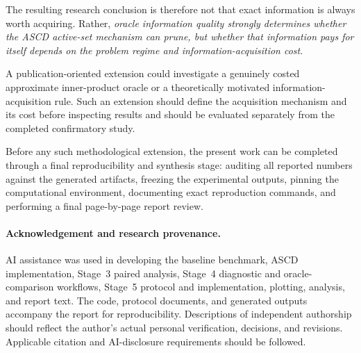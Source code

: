 \documentclass[11pt]{article}
\begin{document}
The resulting research conclusion is therefore not that exact
information is always worth acquiring. Rather, \emph{oracle information
quality strongly determines whether the ASCD active-set mechanism can
prune, but whether that information pays for itself depends on the
problem regime and information-acquisition cost}.

A publication-oriented extension could investigate a genuinely costed
approximate inner-product oracle or a theoretically motivated
information-acquisition rule. Such an extension should define the
acquisition mechanism and its cost before inspecting results and should
be evaluated separately from the completed confirmatory study.

Before any such methodological extension, the present work can be
completed through a final reproducibility and synthesis stage:
auditing all reported numbers against the generated artifacts, freezing
the experimental outputs, pinning the computational environment,
documenting exact reproduction commands, and performing a final
page-by-page report review.


\paragraph{Acknowledgement and research provenance.}
AI assistance was used in developing the baseline benchmark, ASCD
implementation, Stage~3 paired analysis, Stage~4 diagnostic and
oracle-comparison workflows, Stage~5 protocol and implementation,
plotting, analysis, and report text. The code, protocol documents, and
generated outputs accompany the report for reproducibility.
Descriptions of independent authorship should reflect the author's
actual personal verification, decisions, and revisions. Applicable
citation and AI-disclosure requirements should be followed.
\end{document}
